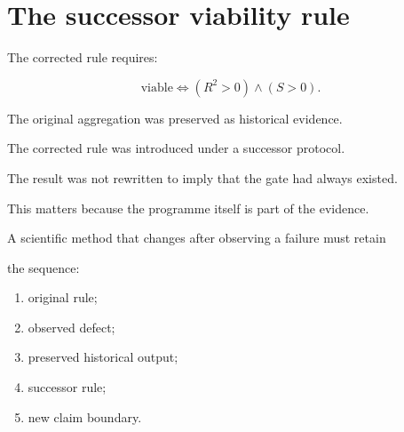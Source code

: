 \documentclass[11pt,a4paper,oneside]{report}
\begin{document}
\section{The successor viability rule}



The corrected rule requires:



\begin{equation}
\text{viable}
\iff
\left(
R^2>0
\right)
\land
\left(
S>0
\right).
\end{equation}



The original aggregation was preserved as historical evidence.



The corrected rule was introduced under a successor protocol.



The result was not rewritten to imply that the gate had always existed.



This matters because the programme itself is part of the evidence.



A scientific method that changes after observing a failure must retain

the sequence:



\begin{enumerate}



\item

original rule;



\item

observed defect;



\item

preserved historical output;



\item

successor rule;



\item

new claim boundary.



\end{enumerate}
\end{document}
